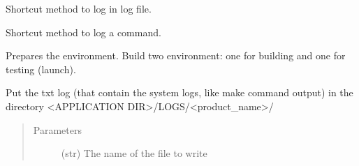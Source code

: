 \documentclass[a4paper,10pt,english]{sphinxmanual}
\begin{document}
\begin{fulllineitems}

\begin{fulllineitems}
\label{\detokenize{apidoc_src/src:src.compilation.Builder.install}}
\end{fulllineitems}


\begin{fulllineitems}
\label{\detokenize{apidoc_src/src:src.compilation.Builder.log}}
Shortcut method to log in log file.

\end{fulllineitems}


\begin{fulllineitems}
\label{\detokenize{apidoc_src/src:src.compilation.Builder.log_command}}
Shortcut method to log a command.

\end{fulllineitems}


\begin{fulllineitems}
\label{\detokenize{apidoc_src/src:src.compilation.Builder.make}}
\end{fulllineitems}


\begin{fulllineitems}
\label{\detokenize{apidoc_src/src:src.compilation.Builder.prepare}}
Prepares the environment.
Build two environment: one for building and one for testing (launch).

\end{fulllineitems}


\begin{fulllineitems}
\label{\detokenize{apidoc_src/src:src.compilation.Builder.put_txt_log_in_appli_log_dir}}
Put the txt log (that contain the system logs, like make command output)
in the directory \textless{}APPLICATION DIR\textgreater{}/LOGS/\textless{}product\_name\textgreater{}/
\begin{quote}\begin{description}
\item[{Parameters}] \leavevmode
{} \textendash{} (str) The name of the file to write


\end{description}
\end{quote}
\end{fulllineitems}
\end{fulllineitems}
\end{document}
